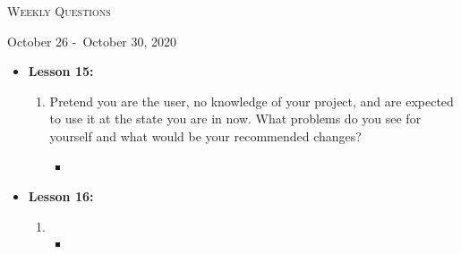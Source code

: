 \centerline{\LARGE\textsc{Weekly Questions}}
\centerline{October 26 -\ October 30, 2020}
\textbf{}
\begin{itemize}
  \item[] \textbf{\large Lesson 15:}
  \begin{enumerate}
    \item Pretend you are the user, no knowledge of your project, and are expected to use it at the state you are in now. What problems do you see for yourself and what would be your recommended changes?
    \begin{itemize}
      \item 
    \end{itemize}
  \end{enumerate} 
\end{itemize}
\begin{itemize}
  \item[] \textbf{\large Lesson 16:}
  \begin{enumerate}
    \item 
    \begin{itemize}
      \item 
    \end{itemize}
  \end{enumerate} 
\end{itemize}
